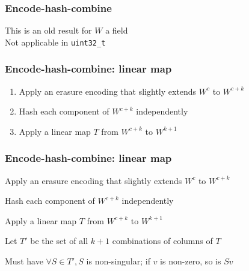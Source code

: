 \documentclass[xcolor=dvipsnames]{beamer}
\begin{document}
\begin{frame}[fragile]
  \frametitle{Encode-hash-combine}
  This is an old result for $W$ a field
  \pause
  \\
$ $\\
  Not applicable in \verb|uint32_t|
\end{frame}




\begin{frame}
  \frametitle{Encode-hash-combine: linear map}
  \begin{enumerate}
  \item Apply an erasure encoding that slightly extends $W^c$ to $W^{c+k}$
  \item Hash each component of $W^{c+k}$ independently
  \item Apply a linear map $T$ from $W^{c+k}$ to $W^{k+1}$
  \end{enumerate}
\end{frame}


\begin{frame}
  \frametitle{Encode-hash-combine: linear map}

  \begin{enumerate}
{\color{gray}  \item Apply an erasure encoding that slightly extends $W^c$ to $W^{c+k}$}
{\color{gray}  \item Hash each component of $W^{c+k}$ independently}
  \item Apply a linear map $T$ from $W^{c+k}$ to $W^{k+1}$
  \end{enumerate}
$ $ \\
  Let $T'$ be the set of all $k+1$ combinations of columns of $T$

  \pause $ $ \\
  Must have $\forall S \in T', S$ is non-singular\pause; if $v$ is non-zero, so is $S v$
\end{frame}
\end{document}
